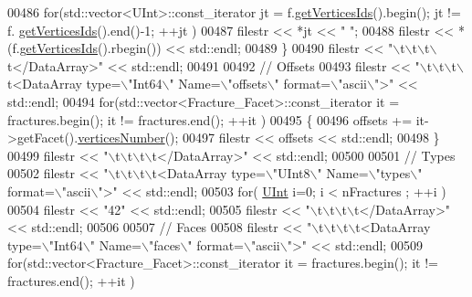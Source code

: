 \begin{DoxyCode}
00486         \textcolor{keywordflow}{for}(std::vector<UInt>::const\_iterator jt = f.\hyperlink{classFVCode3D_1_1Rigid__Mesh_1_1Facet_af92ad0b6b79c69f6c04584301b8998a7}{getVerticesIds}().begin(); jt != f.
      \hyperlink{classFVCode3D_1_1Rigid__Mesh_1_1Facet_af92ad0b6b79c69f6c04584301b8998a7}{getVerticesIds}().end()-1; ++jt )
00487             filestr << *jt << \textcolor{stringliteral}{" "};
00488         filestr << *(f.\hyperlink{classFVCode3D_1_1Rigid__Mesh_1_1Facet_af92ad0b6b79c69f6c04584301b8998a7}{getVerticesIds}().rbegin()) << std::endl;
00489     \}
00490     filestr << \textcolor{stringliteral}{"\(\backslash\)t\(\backslash\)t\(\backslash\)t\(\backslash\)t</DataArray>"} << std::endl;
00491 
00492     \textcolor{comment}{//  Offsets}
00493     filestr << \textcolor{stringliteral}{"\(\backslash\)t\(\backslash\)t\(\backslash\)t\(\backslash\)t<DataArray type=\(\backslash\)"Int64\(\backslash\)" Name=\(\backslash\)"offsets\(\backslash\)" format=\(\backslash\)"ascii\(\backslash\)">"} << std::endl;
00494     \textcolor{keywordflow}{for}(std::vector<Fracture\_Facet>::const\_iterator it = fractures.begin(); it != fractures.end(); ++it )
00495     \{
00496         offsets += it->getFacet().\hyperlink{classFVCode3D_1_1Rigid__Mesh_1_1Facet_a5d18db39a0eeb85e6a4afc2b09813201}{verticesNumber}();
00497         filestr << offsets << std::endl;
00498     \}
00499     filestr << \textcolor{stringliteral}{"\(\backslash\)t\(\backslash\)t\(\backslash\)t\(\backslash\)t</DataArray>"} << std::endl;
00500 
00501     \textcolor{comment}{//  Types}
00502     filestr << \textcolor{stringliteral}{"\(\backslash\)t\(\backslash\)t\(\backslash\)t\(\backslash\)t<DataArray type=\(\backslash\)"UInt8\(\backslash\)" Name=\(\backslash\)"types\(\backslash\)" format=\(\backslash\)"ascii\(\backslash\)">"} << std::endl;
00503     \textcolor{keywordflow}{for}( \hyperlink{namespaceFVCode3D_a4bf7e328c75d0fd504050d040ebe9eda}{UInt} i=0; i < nFractures ; ++i )
00504         filestr << \textcolor{stringliteral}{"42"} << std::endl;
00505     filestr << \textcolor{stringliteral}{"\(\backslash\)t\(\backslash\)t\(\backslash\)t\(\backslash\)t</DataArray>"} << std::endl;
00506 
00507     \textcolor{comment}{//  Faces}
00508     filestr << \textcolor{stringliteral}{"\(\backslash\)t\(\backslash\)t\(\backslash\)t\(\backslash\)t<DataArray type=\(\backslash\)"Int64\(\backslash\)" Name=\(\backslash\)"faces\(\backslash\)" format=\(\backslash\)"ascii\(\backslash\)">"} << std::endl;
00509     \textcolor{keywordflow}{for}(std::vector<Fracture\_Facet>::const\_iterator it = fractures.begin(); it != fractures.end(); ++it )

\end{DoxyCode}
